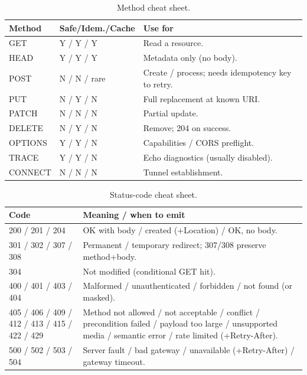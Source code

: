 \begin{table}[h]
  \centering
  \small
  \begin{tabularx}{\textwidth}{l l X}
    \toprule
    \textbf{Method} & \textbf{Safe/Idem./Cache} & \textbf{Use for} \\
    \midrule
    GET     & Y / Y / Y & Read a resource. \\
    HEAD    & Y / Y / Y & Metadata only (no body). \\
    POST    & N / N / rare & Create / process; needs idempotency key to retry. \\
    PUT     & N / Y / N & Full replacement at known URI. \\
    PATCH   & N / N / N & Partial update. \\
    DELETE  & N / Y / N & Remove; 204 on success. \\
    OPTIONS & Y / Y / N & Capabilities / CORS preflight. \\
    TRACE   & Y / Y / N & Echo diagnostics (usually disabled). \\
    CONNECT & N / N / N & Tunnel establishment. \\
    \bottomrule
  \end{tabularx}
  \caption{Method cheat sheet.}
\end{table}

\begin{table}[h]
  \centering
  \small
  \begin{tabularx}{\textwidth}{l X}
    \toprule
    \textbf{Code} & \textbf{Meaning / when to emit} \\
    \midrule
    200 / 201 / 204 & OK with body / created (+Location) / OK, no body. \\
    301 / 302 / 307 / 308 & Permanent / temporary redirect; 307/308 preserve method+body. \\
    304 & Not modified (conditional GET hit). \\
    400 / 401 / 403 / 404 & Malformed / unauthenticated / forbidden / not found (or masked). \\
    405 / 406 / 409 / 412 / 413 / 415 / 422 / 429 & Method not allowed / not acceptable / conflict / precondition failed / payload too large / unsupported media / semantic error / rate limited (+Retry-After). \\
    500 / 502 / 503 / 504 & Server fault / bad gateway / unavailable (+Retry-After) / gateway timeout. \\
    \bottomrule
  \end{tabularx}
  \caption{Status-code cheat sheet.}
\end{table}

